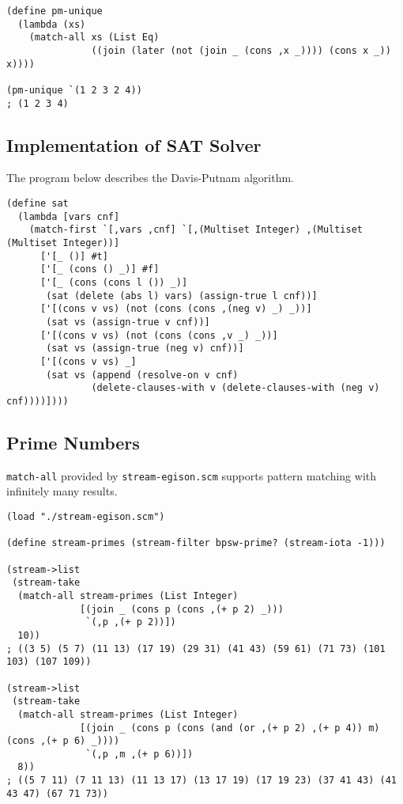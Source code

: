 \documentclass[acmlarge]{acmart}
\begin{document}
{\footnotesize
\begin{lstlisting}[language=egison]
(define pm-unique
  (lambda (xs)
    (match-all xs (List Eq)
               ((join (later (not (join _ (cons ,x _)))) (cons x _)) x))))

(pm-unique `(1 2 3 2 4))
; (1 2 3 4)
\end{lstlisting}
}

\subsection{Implementation of SAT Solver}

The program below describes the Davis-Putnam algorithm.

\begin{lstlisting}[language=egison]
(define sat
  (lambda [vars cnf]
    (match-first `[,vars ,cnf] `[,(Multiset Integer) ,(Multiset (Multiset Integer))]
      ['[_ ()] #t]
      ['[_ (cons () _)] #f]
      ['[_ (cons (cons l ()) _)]
       (sat (delete (abs l) vars) (assign-true l cnf))]
      ['[(cons v vs) (not (cons (cons ,(neg v) _) _))]
       (sat vs (assign-true v cnf))]
      ['[(cons v vs) (not (cons (cons ,v _) _))]
       (sat vs (assign-true (neg v) cnf))]
      ['[(cons v vs) _]
       (sat vs (append (resolve-on v cnf)
               (delete-clauses-with v (delete-clauses-with (neg v) cnf))))])))
\end{lstlisting}


\subsection{Prime Numbers}

\texttt{match-all} provided by \verb|stream-egison.scm| supports pattern matching with infinitely many results.

\begin{lstlisting}[language=egison]
(load "./stream-egison.scm")

(define stream-primes (stream-filter bpsw-prime? (stream-iota -1)))

(stream->list
 (stream-take
  (match-all stream-primes (List Integer)
             [(join _ (cons p (cons ,(+ p 2) _)))
              `(,p ,(+ p 2))])
  10))
; ((3 5) (5 7) (11 13) (17 19) (29 31) (41 43) (59 61) (71 73) (101 103) (107 109))

(stream->list
 (stream-take
  (match-all stream-primes (List Integer)
             [(join _ (cons p (cons (and (or ,(+ p 2) ,(+ p 4)) m) (cons ,(+ p 6) _))))
              `(,p ,m ,(+ p 6))])
  8))
; ((5 7 11) (7 11 13) (11 13 17) (13 17 19) (17 19 23) (37 41 43) (41 43 47) (67 71 73))
\end{lstlisting}
\end{document}
